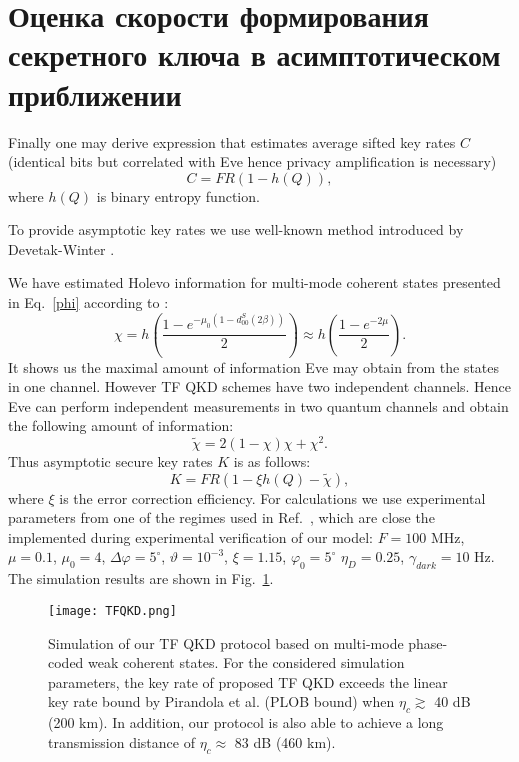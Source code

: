 \section{Оценка скорости формирования секретного ключа в асимптотическом приближении} \label{ch:ch6/sec2}

Finally one may derive expression that estimates average sifted key rates $C$ (identical bits but correlated with Eve hence privacy amplification is necessary)
\begin{equation}
    C=FR(1-h(Q)),
\end{equation}
where $h(Q)$ is binary entropy function.

To provide asymptotic key rates we use well-known method introduced by Devetak-Winter \cite{devetak2005distillation}.

We have estimated Holevo information for multi-mode coherent states presented in Eq.~\ref{phi} according to \cite{kozubov2019finite}:
\begin{equation}
    \chi=h\left(\frac{1-e^{-\mu_0(1-d^S_{00}(2\beta))}}{2}\right)\approx h\left(\frac{1-e^{-2\mu}}{2}\right).
\end{equation}
It shows us the maximal amount of information Eve may obtain from the states in one channel. However TF QKD schemes have two independent channels. Hence Eve can perform independent measurements in two quantum channels and obtain the following amount of information:
\begin{equation}
    \tilde{\chi}=2(1-\chi)\chi+\chi^2.
\end{equation}
Thus asymptotic secure key rates $K$ is as follows:
\begin{equation}
     K=FR(1-\xi h(Q)-\tilde{\chi}),
\end{equation}
where $\xi$ is the error correction efficiency. 
For calculations we use experimental parameters from one of the regimes used in Ref.~\cite{Gleim16,Miroshnichenko18}, which are close the implemented during experimental verification of our model: $F=100$ MHz, $\mu=0.1$, $\mu_0=4$, $\Delta\varphi=5^{\circ}$, $\vartheta=10^{-3}$, $\xi=1.15$, $\varphi_0=5^{\circ}$ $\eta_D=0.25$, $\gamma_{dark}= 10$ Hz. The simulation results are shown in Fig.~\ref{fig:fig2}.

\begin{figure}
	\texttt{[image: TFQKD.png]}
	\caption{ Simulation of our TF QKD protocol based on multi-mode phase-coded weak coherent states. For the considered simulation parameters, the key rate of proposed TF QKD exceeds the linear key rate bound by Pirandola et al. (PLOB bound) \cite{pirandola2017fundamental} when $\eta_c \gtrsim$ 40 dB (200 km). In addition, our protocol is also able to achieve a long transmission distance of $\eta_c\approx$ 83 dB (460 km). %
	}
	\label{fig:fig2}
\end{figure}


